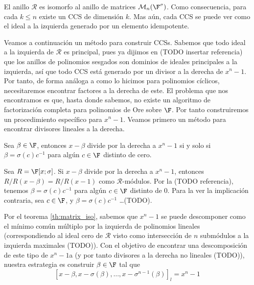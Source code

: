

\begin{theorem}\label{th:matrix_iso}
    El anillo \(\mathcal{R}\) es isomorfo al anillo de matrices \(\mathcal{M}_n(\F^\sigma)\). Como consecuencia, para cada \(k \leq n\) existe un CCS de dimensión \(k\). Mas aún, cada CCS se puede ver como el ideal a la izquierda generado por un elemento idempotente.
\end{theorem}

\begin{proofs}

\end{proofs}

Veamos a continuación un método para construir CCSs. Sabemos que todo ideal a la izquierda de \(\mathcal{R}\) es principal, pues ya dijimos en (TODO insertar referencia) que los anillos de polinomios sesgados son dominios de ideales principales a la izquierda, así que todo CCS está generado por un divisor a la derecha de \(x^n - 1\). Por tanto, de forma análoga a como lo hicimos para polinomios cíclicos, necesitaremos encontrar factores a la derecha de este. El problema que nos encontramos es que, hasta donde sabemos, no existe un algoritmo de factorización completa para polinomios de Ore sobre \(\F\). Por tanto construiremos un procedimiento específico para \(x^n - 1\). Veamos primero un método para encontrar divisores lineales a la derecha.

\begin{proposition}
\label{prop:x_beta}
    Sea \(\beta \in \F\), entonces  \(x - \beta\) divide por la derecha a  \(x^n -1\) si y solo si  \(\beta = \sigma(c)c^{-1}\) para algún  \(c \in \F\) distinto de cero.
\end{proposition}

\begin{proofs}
    Sea \(R = \F[x; \sigma]\). Si \(x - \beta\) divide por la derecha a \(x^n - 1\), entonces \(R/R(x - \beta) = R/R(x-1)\) como \(\mathcal{R}\)-módulos. Por la (TODO referencia), tenemos \(\beta = \sigma(c)c^{-1}\) para algún \(c \in \F\) distinto de 0. Para la ver la implicación contraria, sea  \(c \in \F\), y  \(\beta = \sigma(c)c^{-1}\) \dots (TODO).
\end{proofs}

Por el teorema \ref{th:matrix_iso}, sabemos que \(x^n - 1\) se puede descomponer como el mínimo común múltiplo por la izquierda de polinomios lineales (correspondiendo al ideal cero de \(\mathcal{R}\) visto como intersección de \(n\) submódulos a la izquierda maximales (TODO)). Con el objetivo de encontrar una descomposición de este tipo de \(x^n - 1\)a (y por tanto divisores a la derecha no lineales (TODO)), nuestra estrategia es construir \(\beta \in \F\) tal que
\begin{equation}
\label{eq:lclm}
[x - \beta, x - \sigma(\beta), \dots, x - \sigma^{n-1}(\beta)]_l = x^n -1
\end{equation}

